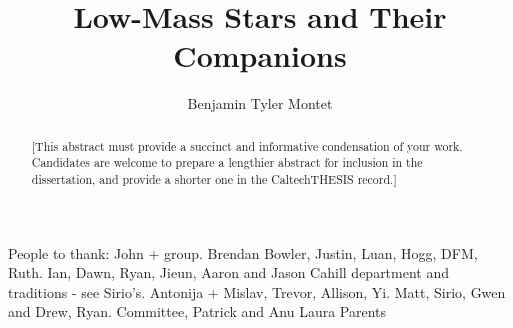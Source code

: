\documentclass[12pt]{caltech_thesis}
\newcommand{\todo}[3]{{\color{#2} \emph{#1} TO DO: #3}}
\begin{document}
\title{Low-Mass Stars and Their Companions}
\author{Benjamin Tyler Montet}

\address{Pasadena, California}                     %



\maketitle[logo]

\begin{acknowledgements} 	 
   People to thank: John + group. Brendan Bowler, Justin, Luan, 
   Hogg, DFM, Ruth. 
   Ian, Dawn, Ryan, Jieun, Aaron and Jason
   Cahill department and traditions - see Sirio's.
   Antonija + Mislav, Trevor, Allison, Yi. Matt, Sirio, Gwen and Drew, Ryan.
   Committee, Patrick and Anu
   Laura
   Parents
   
\end{acknowledgements}

\begin{abstract}
   [This abstract must provide a succinct and informative condensation of your work. Candidates are welcome to prepare a lengthier abstract for inclusion in the dissertation, and provide a shorter one in the CaltechTHESIS record.]
\end{abstract}

\end{document}
